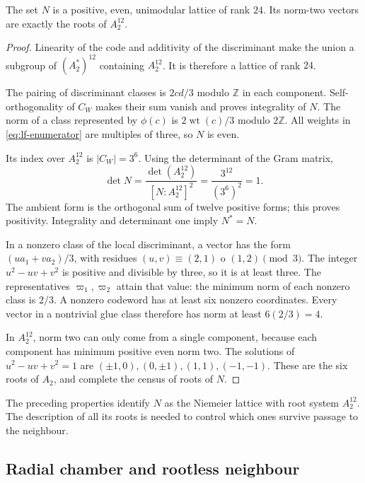 \begin{theorem}
\label{thm:lf-niemeier}
The set \(N\) is a positive, even,
unimodular lattice of rank \(24\). Its norm-two vectors
are exactly the roots of \(A_2^{12}\).
\end{theorem}
\begin{proof}
Linearity of the code and additivity of the discriminant
make the union a subgroup of
\((A_2^*)^{12}\) containing \(A_2^{12}\).
It is therefore a lattice of rank \(24\).

The pairing of discriminant classes is
\(2cd/3\) modulo \(\mathbb Z\) in each component.
Self-orthogonality of \(C_W\) makes their sum vanish and proves
integrality of \(N\). The norm of a class
represented by \(\phi(c)\) is
\(2\operatorname{wt}(c)/3\) modulo \(2\mathbb Z\).
All weights in \eqref{eq:lf-enumerator} are
multiples of three, so \(N\) is even.

Its index over \(A_2^{12}\) is \(|C_W|=3^6\).
Using the determinant of the Gram matrix,
\[
 \det N=\frac{\det(A_2^{12})}{[N:A_2^{12}]^2}
       =\frac{3^{12}}{(3^6)^2}=1.
\]
The ambient form is the orthogonal sum of twelve positive
forms; this proves positivity.
Integrality and determinant one imply
\(N^*=N\).

In a nonzero class of the local discriminant, a
vector has the form \((ua_1+va_2)/3\), with residues
\((u,v)\equiv(2,1)\) o \((1,2)\pmod3\).
The integer \(u^2-uv+v^2\) is positive and divisible
by three, so it is at least three. The representatives
\(\varpi_1,\varpi_2\) attain that value: the minimum
norm of each nonzero class is \(2/3\).
A nonzero codeword has at least
six nonzero coordinates. Every vector in a nontrivial
glue class therefore has norm
at least \(6(2/3)=4\).

In \(A_2^{12}\), norm two can only come
from a single component, because each component
has minimum positive even norm two. The solutions
of \(u^2-uv+v^2=1\) are
\((\pm1,0),(0,\pm1),(1,1),(-1,-1)\).
These are the six roots of \(A_2\), and complete the census
of roots of \(N\).
\end{proof}

The preceding properties identify \(N\) as the
Niemeier lattice with root system \(A_2^{12}\).
The description of all its roots is needed to
control which ones survive passage to the neighbour.

\subsection{Radial chamber and rootless neighbour}
\label{subsec:lf-neighbour}

